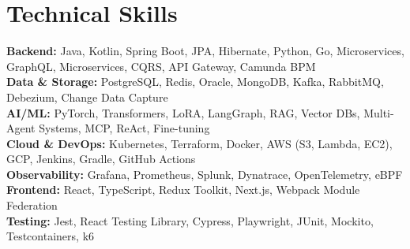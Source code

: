 \documentclass[letterpaper,11pt]{article}
\begin{document}
\section{Technical Skills}
\vspace{-7pt}
\begin{itemize}[leftmargin=0.15in, label={}]\small{\item{
\textbf{Backend:}{ Java, Kotlin, Spring Boot, JPA, Hibernate, Python, Go, Microservices, GraphQL, Microservices, CQRS, API Gateway, Camunda BPM} \\
\textbf{Data \& Storage:}{ PostgreSQL, Redis, Oracle, MongoDB, Kafka, RabbitMQ, Debezium, Change Data Capture} \\
\textbf{AI/ML:}{ PyTorch, Transformers, LoRA, LangGraph, RAG, Vector DBs, Multi-Agent Systems, MCP, ReAct, Fine-tuning} \\
\textbf{Cloud \& DevOps:}{ Kubernetes, Terraform, Docker, AWS (S3, Lambda, EC2), GCP, Jenkins, Gradle, GitHub Actions} \\
\textbf{Observability:}{ Grafana, Prometheus, Splunk, Dynatrace, OpenTelemetry, eBPF} \\
\textbf{Frontend:}{ React, TypeScript, Redux Toolkit, Next.js, Webpack Module Federation} \\
\textbf{Testing:}{ Jest, React Testing Library, Cypress, Playwright, JUnit, Mockito, Testcontainers, k6}
}}
\end{itemize}
\end{document}
